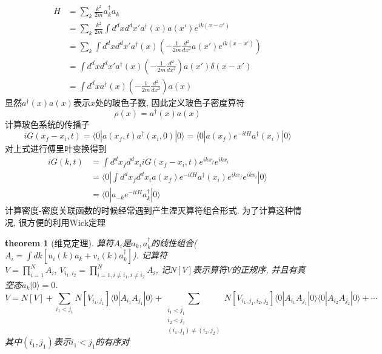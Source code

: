 \documentclass[a4paper,11pt]{article}
\newtheorem{theorem}{theorem}[subsection]
\begin{document}
\begin{equation*}
  \begin{split}
     H & =\sum_{k}\frac{k^2}{2m}a_k^\dag a_k \\
       & =\sum_{k}\frac{k^2}{2m}\int d^dxd^dx'a^\dag(x)a(x')e^{ik(x-x')} \\
       & =\sum_{k}\int d^dxd^dx'a^\dag(x)(-\frac{1}{2m}\frac{d^2}{dx^2}a(x')e^{ik(x-x')}) \\
       & =\int d^dxd^dx'a^\dag(x)(-\frac{1}{2m}\frac{d^2}{dx^2})a(x')\delta(x-x') \\
       & =\int d^dxa^\dag(x)(-\frac{1}{2m}\frac{d^2}{dx^2})a(x)
  \end{split}
\end{equation*}
显然$a^\dag(x)a(x)$表示$x$处的玻色子数, 因此定义玻色子密度算符
\begin{equation*}
  \rho(x)=a^\dag(x)a(x)
\end{equation*}
计算玻色系统的传播子
\begin{equation*}
  iG(x_f-x_i,t)=\langle0| a(x_f,t)a^\dag(x_i,0)|0\rangle=\langle0|a(x_f)e^{-itH}a^\dag(x_i)|0\rangle
\end{equation*}
对上式进行傅里叶变换得到
\begin{equation*}
  \begin{split}
     iG(k,t)&=\int d^dx_fd^dx_i iG(x_f-x_i,t)e^{ikx_f}e^{ikx_i} \\
       &=\langle0|\int d^dx_fd^dx_ia(x_f)e^{-itH}a^\dag(x_i)e^{ikx_f}e^{ikx_i}|0\rangle\\
       &=\langle0|a_{-k}e^{-itH}a_{k}^\dag|0\rangle
  \end{split}
\end{equation*}
计算密度-密度关联函数的时候经常遇到产生湮灭算符组合形式. 为了计算这种情况, 很方便的利用Wick定理
\begin{theorem}[维克定理]
  算符$A_i$是$a_k,a^\dag_k$的线性组合($A_i=\int dk[u_i(k)a_k+v_i(k)a_k^\dag]$). 记算符$V=\prod_{i=1}^N A_i,\,V_{i_1,i_2}=\prod_{i=1,i\neq i_1,i\neq i_2}^NA_i$, 记$N[V]$表示算符$V$的正规序, 并且有真空态$a_k|0\rangle=0$.
  \begin{equation*}
    V=N[V]+\sum_{i_1<j_1}N[V_{i_1,j_1}]\langle0|A_{i_1}A_{j_1}|0\rangle+\sum_{\substack{i_1<j_1\\i_2<j_2\\(i_1,j_1)\neq(i_2,j_2)}}N[V_{i_1,j_1,i_2,j_2}]\langle0|A_{i_1}A_{j_1}|0\rangle\langle0|A_{i_2}A_{j_2}|0\rangle+\cdots
  \end{equation*}
  其中$(i_1,j_1)$表示$i_1<j_1$的有序对
\end{theorem}
\end{document}
